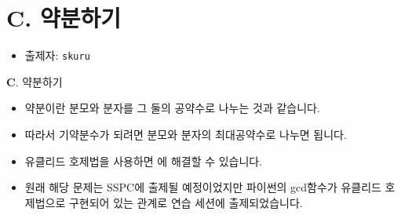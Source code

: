 \section{C. 약분하기}

\begin{frame} %
    \begin{itemize}
        \item 출제자: \texttt{skuru}
    \end{itemize}
\end{frame}

\begin{frame}{\textbf{C}. 약분하기}
    \begin{itemize}
        \item 약분이란 분모와 분자를 그 둘의 공약수로 나누는 것과 같습니다.
        \item 따라서 기약분수가 되려면 분모와 분자의 최대공약수로 나누면 됩니다.
        \item 유클리드 호제법을 사용하면 에 해결할 수 있습니다. \\[2em]
        \item 원래 해당 문제는 SSPC에 출제될 예정이었지만 파이썬의 gcd함수가 유클리드 호제법으로 구현되어 있는 관계로 연습 세션에 출제되었습니다.
    \end{itemize}
\end{frame}
